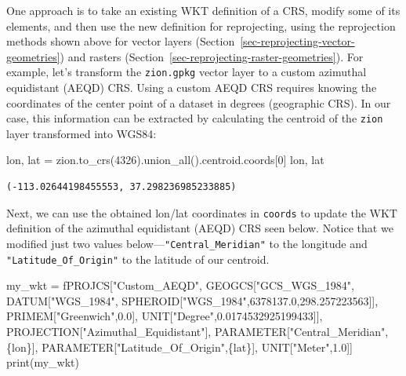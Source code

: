\documentclass[
  letterpaper,
]{krantz}
\newenvironment{Shaded}{\begin{snugshade}}{\end{snugshade}}
\newcommand{\BuiltInTok}[1]{\textcolor[rgb]{0.00,0.23,0.31}{#1}}
\newcommand{\DecValTok}[1]{\textcolor[rgb]{0.68,0.00,0.00}{#1}}
\newcommand{\NormalTok}[1]{\textcolor[rgb]{0.00,0.23,0.31}{#1}}
\newcommand{\OperatorTok}[1]{\textcolor[rgb]{0.37,0.37,0.37}{#1}}
\newcommand{\SpecialCharTok}[1]{\textcolor[rgb]{0.37,0.37,0.37}{#1}}
\newcommand{\SpecialStringTok}[1]{\textcolor[rgb]{0.13,0.47,0.30}{#1}}
\begin{document}
One approach is to take an existing WKT definition of a CRS, modify some
of its elements, and then use the new definition for reprojecting, using
the reprojection methods shown above for vector layers
(Section~\ref{sec-reprojecting-vector-geometries}) and rasters
(Section~\ref{sec-reprojecting-raster-geometries}). For example, let's
transform the \texttt{zion.gpkg} vector layer to a custom azimuthal
equidistant (AEQD) CRS. Using a custom AEQD CRS requires knowing the
coordinates of the center point of a dataset in degrees (geographic
CRS). In our case, this information can be extracted by calculating the
centroid of the \texttt{zion} layer transformed into WGS84:

\begin{Shaded}
\begin{Highlighting}[]
\NormalTok{lon, lat }\OperatorTok{=}\NormalTok{ zion.to\_crs(}\DecValTok{4326}\NormalTok{).union\_all().centroid.coords[}\DecValTok{0}\NormalTok{]}
\NormalTok{lon, lat}
\end{Highlighting}
\end{Shaded}

\begin{verbatim}
(-113.02644198455553, 37.298236985233885)
\end{verbatim}

Next, we can use the obtained lon/lat coordinates in \texttt{coords} to
update the WKT definition of the azimuthal equidistant (AEQD) CRS seen
below. Notice that we modified just two values
below---\texttt{"Central\_Meridian"} to the longitude and
\texttt{"Latitude\_Of\_Origin"} to the latitude of our centroid.

\begin{Shaded}
\begin{Highlighting}[]
\NormalTok{my\_wkt }\OperatorTok{=} \SpecialStringTok{f\textquotesingle{}\textquotesingle{}\textquotesingle{}PROJCS["Custom\_AEQD",}
\SpecialStringTok{ GEOGCS["GCS\_WGS\_1984",}
\SpecialStringTok{  DATUM["WGS\_1984",}
\SpecialStringTok{   SPHEROID["WGS\_1984",6378137.0,298.257223563]],}
\SpecialStringTok{  PRIMEM["Greenwich",0.0],}
\SpecialStringTok{  UNIT["Degree",0.0174532925199433]],}
\SpecialStringTok{ PROJECTION["Azimuthal\_Equidistant"],}
\SpecialStringTok{ PARAMETER["Central\_Meridian",}\SpecialCharTok{\{}\NormalTok{lon}\SpecialCharTok{\}}\SpecialStringTok{],}
\SpecialStringTok{ PARAMETER["Latitude\_Of\_Origin",}\SpecialCharTok{\{}\NormalTok{lat}\SpecialCharTok{\}}\SpecialStringTok{],}
\SpecialStringTok{ UNIT["Meter",1.0]]\textquotesingle{}\textquotesingle{}\textquotesingle{}}
\BuiltInTok{print}\NormalTok{(my\_wkt)}
\end{Highlighting}
\end{Shaded}
\end{document}
